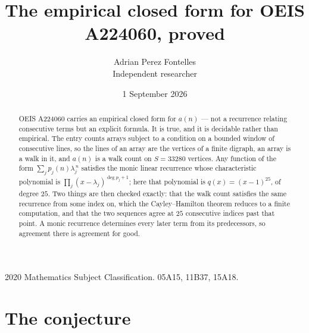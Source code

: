 \documentclass[11pt,a4paper]{article}
\title{The empirical closed form for OEIS A224060, proved}
\author{Adrian Perez Fontelles\\ \small Independent researcher}
\date{1 September 2026}
\theoremstyle{plain}
\theoremstyle{definition}
\begin{document}
\maketitle

\begin{abstract}
OEIS A224060 carries an empirical closed form for $a(n)$ --- not a recurrence relating
consecutive terms but an explicit formula. It is true, and it is decidable rather than
empirical. The entry counts arrays subject to a condition on a bounded window of consecutive lines, so the lines of an array are the
vertices of a finite digraph, an array is a walk in it, and $a(n)$ is a walk count on
$S=33280$ vertices. Any function of the form $\sum_j p_j(n)\lambda_j^{\,n}$ satisfies the
monic linear recurrence whose characteristic polynomial is
$\prod_j(x-\lambda_j)^{\deg p_j+1}$; here that polynomial is $q(x)=(x-1)^{25}$, of degree
$25$. Two things are then checked exactly: that the walk count satisfies the same
recurrence from some index on, which the Cayley--Hamilton theorem reduces to a finite
computation, and that the two sequences agree at $25$ consecutive indices past that
point. A monic recurrence determines every later term from its predecessors, so agreement
there is agreement for good.
\end{abstract}

\noindent\small 2020 Mathematics Subject Classification. 05A15, 11B37, 15A18.\normalsize

\section{The conjecture}
\end{document}
